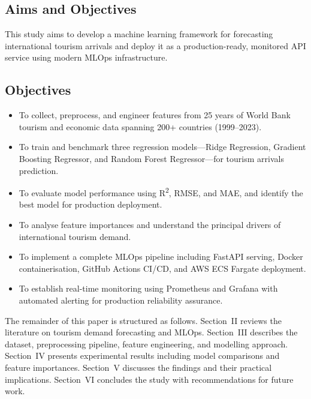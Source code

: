 \documentclass[conference]{IEEEtran}
\begin{document}
\subsection{Aims and Objectives}

This study aims to develop a machine learning framework for
forecasting international tourism arrivals and deploy it as a
production-ready, monitored API service using modern MLOps
infrastructure.

\subsection{Objectives}

\begin{itemize}
  \item To collect, preprocess, and engineer features from 25
        years of World Bank tourism and economic data spanning
        200+ countries (1999--2023).
  \item To train and benchmark three regression models---Ridge
        Regression, Gradient Boosting Regressor, and Random
        Forest Regressor---for tourism arrivals prediction.
  \item To evaluate model performance using R\textsuperscript{2},
        RMSE, and MAE, and identify the best model for
        production deployment.
  \item To analyse feature importances and understand the
        principal drivers of international tourism demand.
  \item To implement a complete MLOps pipeline including
        FastAPI serving, Docker containerisation, GitHub Actions
        CI/CD, and AWS ECS Fargate deployment.
  \item To establish real-time monitoring using Prometheus
        and Grafana with automated alerting for production
        reliability assurance.
\end{itemize}

The remainder of this paper is structured as follows.
Section~II reviews the literature on tourism demand
forecasting and MLOps. Section~III describes the dataset,
preprocessing pipeline, feature engineering, and modelling
approach. Section~IV presents experimental results including
model comparisons and feature importances. Section~V
discusses the findings and their practical implications.
Section~VI concludes the study with recommendations for
future work.

\end{document}
